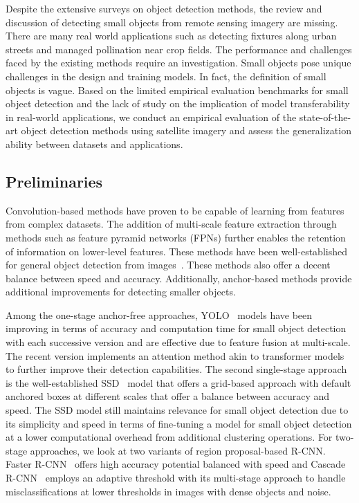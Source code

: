 \documentclass{article}
\begin{document}
Despite the extensive surveys on object detection methods, the review and discussion of detecting small objects from remote sensing imagery are missing. There are many real world applications such as detecting fixtures along urban streets and managed pollination near crop fields. The performance and challenges faced by the existing methods require an investigation. Small objects pose unique challenges in the design and training models. In fact, the definition of small objects is vague. %
Based on the limited empirical evaluation benchmarks for small object detection and the lack of study on the implication of model transferability in real-world applications, we conduct an empirical evaluation of the state-of-the-art object detection methods using satellite imagery and assess the generalization ability between datasets and applications.



\subsection{Preliminaries}

Convolution-based methods have proven to be capable of learning from features from complex datasets. The addition of multi-scale feature extraction through methods such as feature pyramid networks (FPNs) further enables the retention of information on lower-level features. These methods have been well-established for general object detection from images~\cite{2024Sun}. These methods also offer a decent balance between speed and accuracy. Additionally, anchor-based methods provide additional improvements for detecting smaller objects.

Among the one-stage anchor-free approaches, YOLO~\cite{2016Redmon} models have been improving in terms of accuracy and computation time for small object detection with each successive version and are effective due to feature fusion at multi-scale. The recent version implements an attention method akin to transformer models to further improve their detection capabilities. The second single-stage approach is the well-established SSD~\cite{2016Liu} model that offers a grid-based approach with default anchored boxes at different scales that offer a balance between accuracy and speed. The SSD model still maintains relevance for small object detection due to its simplicity and speed in terms of fine-tuning a model for small object detection at a lower computational overhead from additional clustering operations. For two-stage approaches, we look at two variants of region proposal-based R-CNN. Faster R-CNN~\cite{2016Shaoqing} offers high accuracy potential balanced with speed and Cascade R-CNN~\cite{2018Cai} employs an adaptive threshold with its multi-stage approach to handle misclassifications at lower thresholds in images with dense objects and noise.
\end{document}
